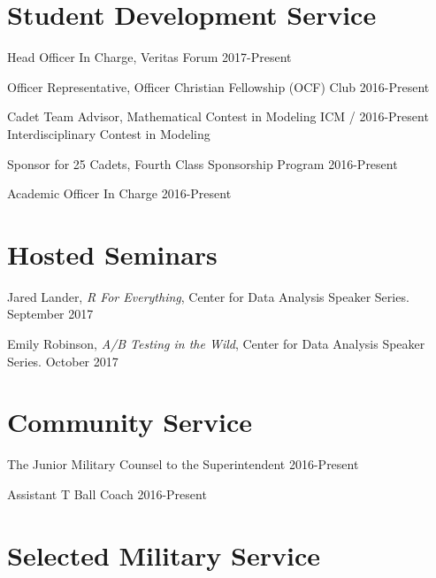 \documentclass[11pt,]{article}
\providecommand{\tightlist}{%
  \setlength{\itemsep}{0pt}\setlength{\parskip}{0pt}}
\renewenvironment{itemize}{
  \begin{list}{}{
    \setlength{\leftmargin}{1.5em}
  }
}{
  \end{list}
}
\begin{document}
\hypertarget{student-development-service}{%
\section{Student Development
Service}\label{student-development-service}}

\begin{itemize}
\tightlist
\item
  Head Officer In Charge, Veritas Forum \hfill 2017-Present
\item
  Officer Representative, Officer Christian Fellowship (OCF) Club
  \hfill 2016-Present
\item
  Cadet Team Advisor, Mathematical Contest in Modeling ICM /
  \hfill 2016-Present \newline  Interdisciplinary Contest in Modeling
\item
  Sponsor for 25 Cadets, Fourth Class Sponsorship Program
  \hfill 2016-Present
\item
  Academic Officer In Charge \hfill 2016-Present
\end{itemize}

\hypertarget{hosted-seminars}{%
\section{Hosted Seminars}\label{hosted-seminars}}

\begin{itemize}
\tightlist
\item
  Jared Lander, \emph{R For Everything}, Center for Data Analysis
  Speaker Series. September 2017
\item
  Emily Robinson, \emph{A/B Testing in the Wild}, Center for Data
  Analysis Speaker Series. October 2017
\end{itemize}

\hypertarget{community-service}{%
\section{Community Service}\label{community-service}}

\begin{itemize}
\tightlist
\item
  The Junior Military Counsel to the Superintendent \hfill 2016-Present
\item
  Assistant T Ball Coach \hfill 2016-Present
\end{itemize}

\hypertarget{selected-military-service}{%
\section{Selected Military Service}\label{selected-military-service}}
\end{document}
